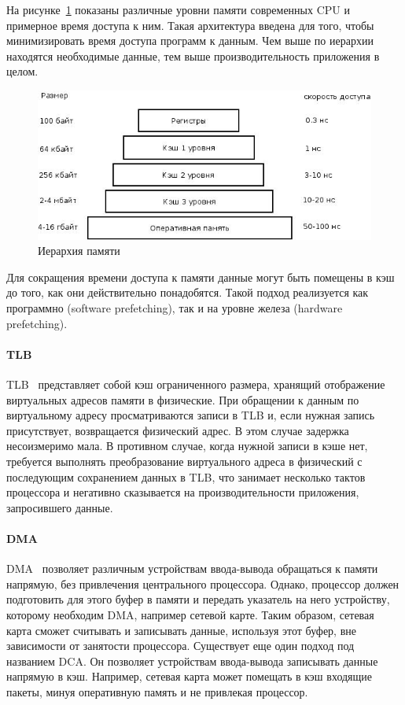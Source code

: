 На рисунке~\ref{pic:memory_schema} показаны различные уровни памяти современных CPU и примерное время доступа к ним. Такая архитектура введена для того, чтобы минимизировать время доступа программ к данным. Чем выше по иерархии находятся необходимые данные, тем выше производительность приложения в целом.
\begin{figure}[h]
\centering
\includegraphics[scale=0.7]{pictures/memory_schema}
\caption{Иерархия памяти}
\label{pic:memory_schema}
\end{figure}

Для сокращения времени доступа к памяти данные могут быть помещены в кэш до того, как они действительно понадобятся. Такой подход реализуется как программно (software prefetching), так и на уровне железа (hardware prefetching).

\paragraph{TLB}

TLB~\cite{modern_os} представляет собой кэш ограниченного размера, хранящий отображение виртуальных адресов памяти в физические. При обращении к данным по виртуальному адресу просматриваются записи в TLB и, если нужная запись присутствует, возвращается физический адрес. В этом случае задержка несоизмеримо мала. В противном случае, когда нужной записи в кэше нет, требуется выполнять преобразование виртуального адреса в физический с последующим сохранением данных в TLB, что занимает несколько тактов процессора и негативно сказывается на производительности приложения, запросившего данные.

\paragraph{DMA}

DMA~\cite{modern_os} позволяет различным устройствам ввода-вывода обращаться к памяти напрямую, без привлечения центрального процессора. Однако, процессор должен подготовить для этого буфер в памяти и передать указатель на него устройству, которому необходим DMA, например сетевой карте. Таким образом, сетевая карта сможет считывать и записывать данные, используя этот буфер, вне зависимости от занятости процессора. Существует еще один подход под названием DCA. Он позволяет устройствам ввода-вывода записывать данные напрямую в кэш. Например, сетевая карта может помещать в кэш входящие пакеты, минуя оперативную память и не привлекая процессор.

